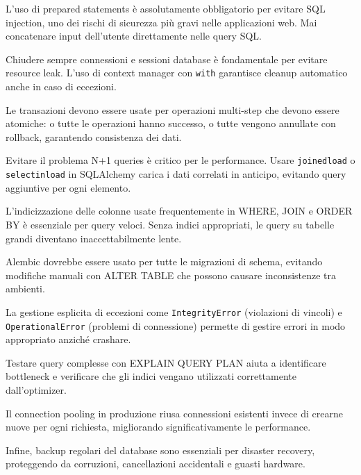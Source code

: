 \begin{tcolorbox}[title=Best Practices]
L'uso di prepared statements è assolutamente obbligatorio per evitare SQL injection, uno dei rischi di sicurezza più gravi nelle applicazioni web. Mai concatenare input dell'utente direttamente nelle query SQL.

Chiudere sempre connessioni e sessioni database è fondamentale per evitare resource leak. L'uso di context manager con \verb|with| garantisce cleanup automatico anche in caso di eccezioni.

Le transazioni devono essere usate per operazioni multi-step che devono essere atomiche: o tutte le operazioni hanno successo, o tutte vengono annullate con rollback, garantendo consistenza dei dati.

Evitare il problema N+1 queries è critico per le performance. Usare \verb|joinedload| o \verb|selectinload| in SQLAlchemy carica i dati correlati in anticipo, evitando query aggiuntive per ogni elemento.

L'indicizzazione delle colonne usate frequentemente in WHERE, JOIN e ORDER BY è essenziale per query veloci. Senza indici appropriati, le query su tabelle grandi diventano inaccettabilmente lente.

Alembic dovrebbe essere usato per tutte le migrazioni di schema, evitando modifiche manuali con ALTER TABLE che possono causare inconsistenze tra ambienti.

La gestione esplicita di eccezioni come \verb|IntegrityError| (violazioni di vincoli) e \verb|OperationalError| (problemi di connessione) permette di gestire errori in modo appropriato anziché crashare.

Testare query complesse con EXPLAIN QUERY PLAN aiuta a identificare bottleneck e verificare che gli indici vengano utilizzati correttamente dall'optimizer.

Il connection pooling in produzione riusa connessioni esistenti invece di crearne nuove per ogni richiesta, migliorando significativamente le performance.

Infine, backup regolari del database sono essenziali per disaster recovery, proteggendo da corruzioni, cancellazioni accidentali e guasti hardware.
\end{tcolorbox}

